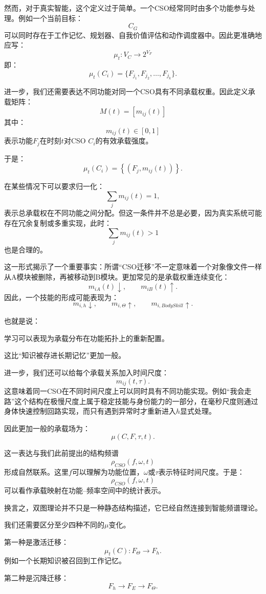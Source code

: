 然而，对于真实智能，这个定义过于简单。一个CSO经常同时由多个功能参与处理。例如一个当前目标：
\[
C_G
\]
可以同时存在于工作记忆、规划器、自我价值评估和动作调度器中。因此更准确地应写：
\[
\boxed{
\mu_t:
V_C
\rightarrow
2^{V_F}
}
\]
即：
\[
\mu_t(C_i)
=
\{F_{j_1},F_{j_2},\ldots,F_{j_k}\}.
\]

进一步，我们还需要表达不同功能对同一个CSO具有不同承载权重。因此定义承载矩阵：
\[
\boxed{
M(t)
=
[m_{ij}(t)]
}
\]
其中：
\[
m_{ij}(t)
\in[0,1]
\]
表示功能$F_j$在时刻$t$对CSO $C_i$的有效承载强度。

于是：
\[
\mu_t(C_i)
=
\left\{
(F_j,m_{ij}(t))
\right\}.
\]

在某些情况下可以要求归一化：
\[
\sum_jm_{ij}(t)=1,
\]
表示总承载权在不同功能之间分配。但这一条件并不总是必要，因为真实系统可能存在冗余复制或多重实现，此时：
\[
\sum_jm_{ij}(t)>1
\]
也是合理的。

这一形式揭示了一个重要事实：所谓“CSO迁移”不一定意味着一个对象像文件一样从A模块被删除，再被移动到B模块。更加常见的是承载权重连续变化：
\[
m_{iA}(t)\downarrow,
\qquad
m_{iB}(t)\uparrow.
\]
因此，一个技能的形成可能表现为：
\[
m_{i,h}\downarrow,
\qquad
m_{i,\Theta}\uparrow,
\qquad
m_{i,BodySkill}\uparrow.
\]

也就是说：
\begin{statementbox}
学习可以表现为承载分布在功能拓扑上的重新配置。
\end{statementbox}

这比“知识被存进长期记忆”更加一般。

进一步，我们还可以给每个承载关系加入时间尺度：
\[
m_{ij}(t,\tau).
\]
这意味着同一CSO在不同时间尺度上可以同时具有不同功能实现。例如“我会走路”这个结构在极慢尺度上属于稳定技能与身份能力的一部分，在毫秒尺度则通过身体快速控制回路实现，而只有遇到异常时才重新进入$h$显式处理。

因此更加一般的承载场为：
\[
\boxed{
\mu(C,F,\tau,t).
}
\]

这一表达与我们此前提出的结构频谱
\[
\rho_{CSO}(f,\omega,t)
\]
形成自然联系。这里$f$可以理解为功能位置，$\omega$或$\tau$表示特征时间尺度。于是：
\[
\boxed{
\rho_{CSO}(f,\omega,t)
}
\]
可以看作承载映射在功能--频率空间中的统计表示。

换言之，双图理论并不只是一种静态结构描述，它已经自然连接到智能频谱理论。

我们还需要区分至少四种不同的$\mu$变化。

第一种是激活迁移：
\[
\mu_t(C)
:
F_{\Theta}
\rightarrow
F_h.
\]
例如一个长期知识被召回到工作记忆。

第二种是沉降迁移：
\[
F_h
\rightarrow
F_E
\rightarrow
F_\Theta.
\]


